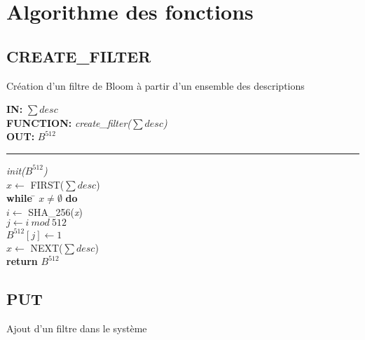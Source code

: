 \chapter{Algorithme des fonctions}
\section{CREATE\_FILTER}
\begin{algorithme}
	Création d'un filtre de Bloom à partir d'un ensemble des descriptions
\end{algorithme}

\begin{flushleft}
	\begin{framed}
		\textbf{IN:} $\sum desc$\\
		\textbf{FUNCTION:} \textit{create\_filter($\sum desc$)}\\
		\textbf{OUT:} \textit{$B^{512}$}\\

		\noindent\rule{\linewidth}{0.5pt}

		\begin{tabbing}
			\textit{init($B^{512}$)}\\
			$x \leftarrow$ FIRST($\sum desc$)\\
			\textbf{while} \= $x \neq \emptyset$ \textbf{do}\\
					\> $i \leftarrow$ SHA\_256(\textit{x})\\
					\> $j \leftarrow i\ mod\ 512$\\
					\> $B^{512}[j]\leftarrow 1$\\
					\> $x \leftarrow$ NEXT($\sum desc$)\\
			\textbf{return} $B^{512}$\\
	    	\end{tabbing}		
	\end{framed}
\end{flushleft}

\newpage
\section{PUT}
\begin{algorithme}
	Ajout d'un filtre dans le système
\end{algorithme}

